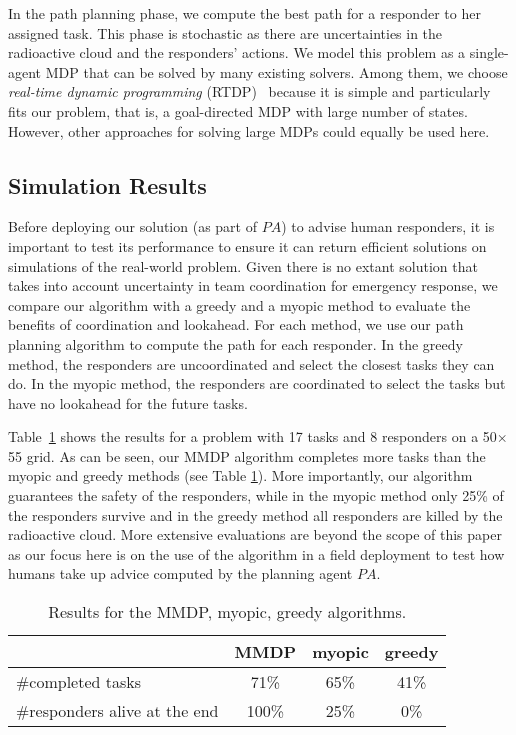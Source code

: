 In the path planning phase, we compute the best path for a
responder to her assigned task. This phase is stochastic as there
are uncertainties in the radioactive cloud and the responders'
actions. We model this problem as a single-agent MDP that can be
solved by many existing solvers. Among them, we choose {\em
real-time dynamic programming} (RTDP)~\cite{barto1995learning}
because it is simple and particularly fits our problem, that is, a
goal-directed MDP with large number of states. However, other
approaches for solving large MDPs  could equally be used here.

\subsection{Simulation Results}

Before deploying our solution (as part of $PA$) to advise human
responders, it is important  to test its performance to ensure it
can return efficient solutions on simulations of the real-world
problem. Given there is no extant solution that takes into account
uncertainty in team coordination for emergency response, we compare
our algorithm with a greedy and a myopic method to evaluate the
benefits of coordination and lookahead. For each method, we use our
path planning algorithm to compute the path for each responder. In
the greedy method, the responders are uncoordinated and select the
closest tasks they can do. In the myopic method, the responders are
coordinated to select the tasks but have no lookahead for the
future tasks.

Table~\ref{tab:simulation} shows the results for a problem with 17
tasks and 8 responders on a 50$\times$55 grid. As can be seen, our
MMDP algorithm completes more tasks than the myopic and greedy
methods (see Table \ref{tab:simulation}). More importantly, our
algorithm guarantees the safety of the responders, while in the
myopic method  only 25\% of the responders survive and in the
greedy method all responders are killed by the radioactive cloud.
More extensive evaluations are beyond the scope of this paper as
our focus here is on the use of the algorithm in a field deployment
to test how humans take up advice computed by the planning agent
$PA$.
\begin{table}[htbp]
  \centering\small
  \caption{Results for the MMDP, myopic, greedy
  algorithms.}\vspace{2pt}
  \begin{tabular}{l|c|c|c}
   & MMDP & myopic & greedy \\
  \hline
  \#completed tasks & 71\% & 65\% & 41\% \\
  \hline
  \#responders alive at the end & 100\% & 25\% & 0\% \\
  \end{tabular}
  \label{tab:simulation}\vspace{-3mm}
\end{table}
